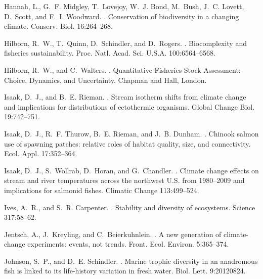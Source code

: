 \documentclass[12pt,english]{article}
\begin{document}
\begin{spacing}{1.3}
\begin{thebibliography}{64}
Hannah, L., G.~F. Midgley, T.~Lovejoy, W.~J. Bond, M.~Bush, J.~C. Lovett,
  D.~Scott, and F.~I. Woodward.
.
\newblock Conservation of biodiversity in a changing climate.
\newblock Conserv. Biol. 16:264--268.

Hilborn, R.~W., T.~Quinn, D.~Schindler, and D.~Rogers.
.
\newblock Biocomplexity and fisheries sustainability.
\newblock Proc. Natl. Acad. Sci. U.S.A. 100:6564--6568.

Hilborn, R.~W., and C.~Walters.
.
\newblock Quantitative Fisheries Stock Assessment: Choice, Dynamics, and
  Uncertainty.
\newblock Chapman and Hall, London.

Isaak, D.~J., and B.~E. Rieman.
.
\newblock Stream isotherm shifts from climate change and implications for
  distributions of ectothermic organisms.
\newblock Global Change Biol. 19:742--751.

Isaak, D.~J., R.~F. Thurow, B.~E. Rieman, and J.~B. Dunham.
.
\newblock Chinook salmon use of spawning patches: relative roles of habitat
  quality, size, and connectivity.
\newblock Ecol. Appl. 17:352--364.

Isaak, D.~J., S.~Wollrab, D.~Horan, and G.~Chandler.
.
\newblock Climate change effects on stream and river temperatures across the
  northwest U.S. from 1980--2009 and implications for salmonid fishes.
\newblock Climatic Change 113:499--524.

Ives, A.~R., and S.~R. Carpenter.
.
\newblock Stability and diversity of ecosystems.
\newblock Science 317:58--62.

Jentsch, A., J.~Kreyling, and C.~Beierkuhnlein.
.
\newblock A new generation of climate-change experiments: events, not trends.
\newblock Front. Ecol. Environ. 5:365--374.

Johnson, S.~P., and D.~E. Schindler.
.
\newblock Marine trophic diversity in an anadromous fish is linked to its
  life-history variation in fresh water.
\newblock Biol. Lett. 9:20120824.


\end{thebibliography}
\end{spacing}
\end{document}
